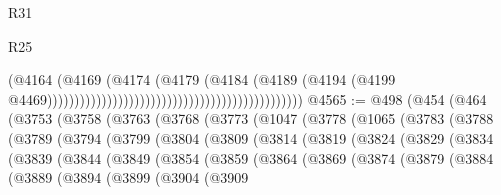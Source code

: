 \begin{lexlean}{R31}
\begin{lexlean}{R25}
\begin{coremodule}
{{{{{{{{{{{{{{{{{{{{{{{{{{{{{{{{{{{{{{{{{{{{{{{{{{{{{{{{{{{{{{{{{{{{{{{{{{{{{{{{{{{{{{{{{{{{{{{{{{{{{{{{{{{{{{{{{{{{{{{{{{{{{{{{{{{{{{{{{{{{{{{{{{{{{{{{{{{{{{{{{{{{{{{{{{{{{{{{{{{{{{{{{{{{{{{{{{{{{{{                                                                                  (@4164
                                                                                    (@4169
                                                                                      (@4174
                                                                                        (@4179
                                                                                          (@4184
                                                                                            (@4189
                                                                                              (@4194
                                                                                                (@4199
                                                                                                  @4469)))))))))))))))))))))))))))))))))))))))))))))))
@4565 := @498
    (@454
      (@464
        (@3753
          (@3758
            (@3763
              (@3768
                (@3773
                  (@1047
                    (@3778
                      (@1065
                        (@3783
                          (@3788
                            (@3789
                              (@3794
                                (@3799
                                  (@3804
                                    (@3809
                                      (@3814
                                        (@3819
                                          (@3824
                                            (@3829
                                              (@3834
                                                (@3839
                                                  (@3844
                                                    (@3849
                                                      (@3854
                                                        (@3859
                                                          (@3864
                                                            (@3869
                                                              (@3874
                                                                (@3879
                                                                  (@3884
                                                                    (@3889
                                                                      (@3894
                                                                        (@3899
                                                                          (@3904
                                                                            (@3909
}}}}}}}}}}}}}}}}}}}}}}}}}}}}}}}}}}}}}}}}}}}}}}}}}}}}}}}}}}}}}}}}}}}}}}}}}}}}}}}}}}}}}}}}}}}}}}}}}}}}}}}}}}}}}}}}}}}}}}}}}}}}}}}}}}}}}}}}}}}}}}}}}}}}}}}}}}}}}}}}}}}}}}}}}}}}}}}}}}}}}}}}}}}}}}}}}}}}}}}
\end{coremodule}
\end{lexlean}
\end{lexlean}
